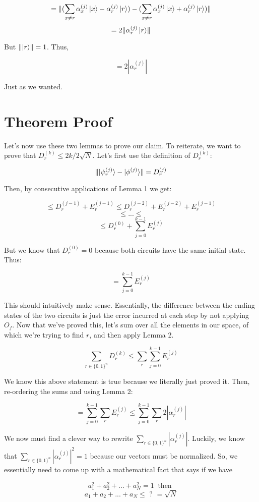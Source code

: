 \documentclass[11pt]{article}
\newcommand{\abs}[1]{\left\lvert #1 \right\rvert}
\begin{document}
{
\[= \lVert (\sum_{x \neq r}\alpha_x^{(j)}\ket{x} - \alpha_r^{(j)}\ket{r}) - (\sum_{x \neq r}\alpha_x^{(j)}\ket{x} + \alpha_r^{(j)}\ket{r})\rVert \]
\[= 2\lVert \alpha_r^{(j)} \ket{r}\rVert\] 
}

But $\lVert \ket{r}\rVert = 1$. Thus, 

{
\[= 2\abs{\alpha_r^{(j)}}\]
}

Just as we wanted.

\section{Theorem Proof}

Let's now use these two lemmas to prove our claim. To reiterate, we want to prove that $D_r^{(k)} \leq 2k/2\sqrt{N}$. Let's first use the definition of $D_r^{(k)}$:

{
\[\lVert \ket{\psi_r^{(j)}} - \ket{\phi^{(j)}} \rVert = D^{(j)}_r\]
}

Then, by consecutive applications of Lemma 1 we get:

{
\[ \leq  D^{(j-1)}_r + E^{(j-1)}_r \leq  D^{(j-2)}_r + E^{(j-2)}_r + E^{(j-1)}_r\]
\[ \leq  ... \leq\]
\[ \leq  D_r^{(0)} + \sum_{j=0}^{k-1}E_r^{(j)}\]
}

But we know that $D_r^{(0)} = 0$ because both circuits have the same initial state. Thus:

{
\[ =\sum_{j=0}^{k-1}E_r^{(j)}\]
}

This should intuitively make sense. Essentially, the difference between the ending states of the two circuits is just the error incurred at each step by not applying $O_f$. Now that we've proved this, let's sum over all the elements in our space, of which we're trying to find $r$, and then apply Lemma 2.

{
\[\sum_{r\in\{0,1\}^n}D_r^{(k)} \leq \sum_r \sum_{j=0}^{k-1}E_r^{(j)}\]
}

We know this above statement is true because we literally just proved it. Then, re-ordering the sums and using Lemma 2:

{
\[= \sum_{j=0}^{k-1}\sum_r E_r^{(j)} \leq \sum_{j=0}^{k-1}\sum_r 2\abs{\alpha_r^{(j)}}\]
}

We now must find a clever way to rewrite $\sum_{r\in\{0,1\}^n}\abs{\alpha_r^{(j)}}$. Luckily, we know that $\sum_{r\in\{0,1\}^n}\abs{\alpha_r^{(j)}}^2 = 1$ because our vectors must be normalized. So, we essentially need to come up with a mathematical fact that says if we have 

{
\[a_1^2 +a_2^2 + ... + a_N^2 = 1\ \text{ then }\]
\[a_1 +a_2 + ... + a_N \leq \text{ ? } = \sqrt{N}\]
}
\end{document}
